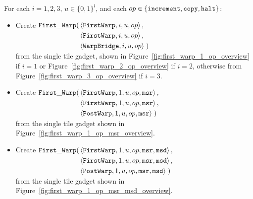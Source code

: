 \begin{itemize}
    For each $i = 1, 2, 3$, $u \in \{0, 1\}^l$, and each $op \in \{ {\tt increment}, {\tt copy}, {\tt halt} \}$:
    \begin{itemize}
        \item Create
        $\begin{aligned}[t]
            \firstwarp(& \left\langle {\tt FirstWarp},  i, u, \inc \right\rangle,\\  %
                       & \left\langle {\tt FirstWarp},  i, u, \inc \right\rangle,\\  %
                       & \left\langle {\tt WarpBridge}, i, u, \inc \right\rangle \;) %
        \end{aligned}$\\ from the single tile gadget, shown in Figure~\ref{fig:first_warp_1_op_overview}
                         if $i = 1$ or Figure~\ref{fig:first_warp_2_op_overview} if $i = 2$, otherwise from
                         Figure~\ref{fig:first_warp_3_op_overview} if $i = 3$.
        \vspace{.5cm}
        \item Create
        $\begin{aligned}[t]
            \firstwarp(& \left\langle {\tt FirstWarp}, 1, u, \inc, {\tt msr} \right\rangle, \\ %
                       & \left\langle {\tt FirstWarp}, 1, u, \inc, {\tt msr} \right\rangle, \\ %
                       & \left\langle {\tt PostWarp},  1, u, \inc, {\tt msr} \right\rangle \;) %
        \end{aligned}$\\ from the single tile gadget shown in Figure~\ref{fig:first_warp_1_op_msr_overview}.
        \vspace{.5cm}
        \item Create
        $\begin{aligned}[t]
            \firstwarp(& \left\langle {\tt FirstWarp}, 1, u, \inc, {\tt msr}, {\tt msd} \right\rangle, \\ %
                       & \left\langle {\tt FirstWarp}, 1, u, \inc, {\tt msr}, {\tt msd} \right\rangle, \\ %
                       & \left\langle {\tt PostWarp},  1, u, \inc, {\tt msr}, {\tt msd} \right\rangle \;) %
        \end{aligned}$\\ from the single tile gadget shown in Figure~\ref{fig:first_warp_1_op_msr_msd_overview}.
        \vspace{.5cm}

\end{itemize}
\end{itemize}
